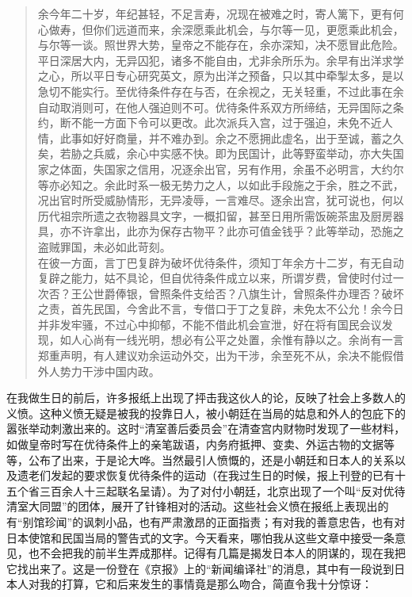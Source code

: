 \begin{quote}
	余今年二十岁，年纪甚轻，不足言寿，况现在被难之时，寄人篱下，更有何心做寿，但你们远道而来，余深愿乘此机会，与尔等一见，更愿乘此机会，与尔等一谈。照世界大势，皇帝之不能存在，余亦深知，决不愿冒此危险。平日深居大内，无异囚犯，诸多不能自由，尤非余所乐为。余早有出洋求学之心，所以平日专心研究英文，原为出洋之预备，只以其中牵掣太多，是以急切不能实行。至优待条件存在与否，在余视之，无关轻重，不过此事在余自动取消则可，在他人强迫则不可。优待条件系双方所缔结，无异国际之条约，断不能一方面下令可以更改。此次派兵入宫，过于强迫，未免不近人情，此事如好好商量，并不难办到。余之不愿拥此虚名，出于至诚，蓄之久矣，若胁之兵威，余心中实感不快。即为民国计，此等野蛮举动，亦大失国家之体面，失国家之信用，况逐余出官，另有作用，余虽不必明言，大约尔等亦必知之。余此时系一极无势力之人，以如此手段施之于余，胜之不武，况出官时所受威胁情形，无异凌辱，一言难尽。逐余出宫，犹可说也，何以历代祖宗所遗之衣物器具文字，一概扣留，甚至日用所需饭碗茶盅及厨房器具，亦不许拿出，此亦为保存古物平？此亦可值金钱乎？此等举动，恐施之盗贼罪国，未必如此苛刻。\\

在彼一方面，言丁巴复辟为破坏优待条件，须知丁年余方十二岁，有无自动复辟之能力，姑不具论，但自优待条件成立以来，所谓岁费，曾使时付过一次否？王公世爵俸银，曾照条件支给否？八旗生计，曾照条件办理否？破坏之责，首先民国，今舍此不言，专借口于丁之复辟，未免太不公允！余今日并非发牢骚，不过心中抑郁，不能不借此机会宣泄，好在将有国民会议发现，如人心尚有一线光明，想必有公平之处置，余惟有静以之。余尚有一言郑重声明，有人建议劝余运动外交，出为干涉，余至死不从，余决不能假借外人势力干涉中国内政。\\
\end{quote}

在我做生日的前后，许多报纸上出现了抨击我这伙人的论，反映了社会上多数人的义愤。这种义愤无疑是被我的投靠日人，被小朝廷在当局的姑息和外人的包庇下的嚣张举动刺激出来的。这时“清室善后委员会”在清查宫内财物时发现了一些材料，如做皇帝时写在优待条件上的亲笔跋语，内务府抵押、变卖、外运古物的文据等等，公布了出来，于是论大哗。当然最引人愤慨的，还是小朝廷和日本人的关系以及遗老们发起的要求恢复优待条件的运动（在我过生日的时候，报上刊登的已有十五个省三百余人十三起联名呈请）。为了对付小朝廷，北京出现了一个叫“反对优待清室大同盟”的团体，展开了针锋相对的活动。这些社会义愤在报纸上表现出的有“别馆珍闻”的讽刺小品，也有严肃激昂的正面指责；有对我的善意忠告，也有对日本使馆和民国当局的警告式的文字。今天看来，哪怕我从这些文章中接受一条意见，也不会把我的前半生弄成那样。记得有几篇是揭发日本人的阴谋的，现在我把它找出来了。这是一份登在《京报》上的“新闻编译社”的消息，其中有一段说到日本人对我的打算，它和后来发生的事情竟是那么吻合，简直令我十分惊讶：\\

